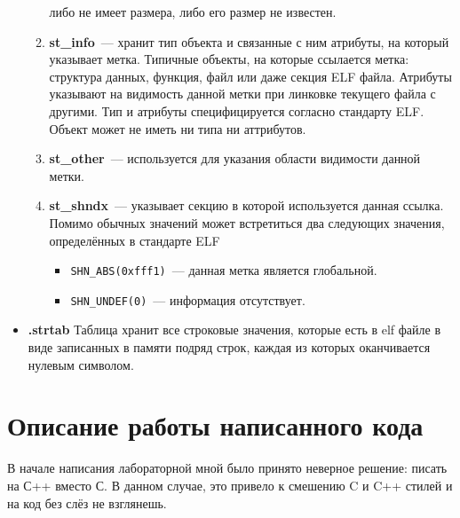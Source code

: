 \documentclass[14pt, russian, onesize]{extreport}
\begin{document}
\begin{itemize}
\begin{enumerate}
                либо не имеет размера, либо его размер не известен.
            \item \textbf{st\_info}~--- хранит тип объекта и связанные с ним
                атрибуты, на который указывает
                метка. 
                Типичные объекты, на которые ссылается метка: структура данных,
                функция, файл или даже секция ELF файла. Атрибуты указывают
                на видимость данной метки при линковке текущего файла с
                другими.
                Тип и атрибуты специфицируется согласно стандарту ELF.
                Объект может не иметь ни типа ни аттрибутов.
            \item \textbf{st\_other}~--- используется для указания
                области видимости данной метки.

            \item \textbf{st\_shndx}~--- указывает секцию в которой 
                 используется данная ссылка. Помимо обычных значений
                 может встретиться два следующих значения, определённых
                 в стандарте ELF
                 \begin{itemize}
                     \item \texttt{SHN\_ABS(0xfff1)}~--- данная метка является 
                         глобальной.
                     \item \texttt{SHN\_UNDEF(0)}~--- информация отсутствует.
                 \end{itemize}
        \end{enumerate}
    \item \textbf{.strtab} Таблица хранит все строковые
        значения, которые есть в elf файле в виде записанных в памяти
        подряд строк, каждая из которых оканчивается нулевым символом.
\end{itemize}

\section*{Описание работы написанного кода}
В начале написания лабораторной мной было принято неверное решение: писать
на С++ вместо С. В данном случае, это привело к смешению C и C++ стилей и на код
без слёз не взглянешь. 
\end{document}
